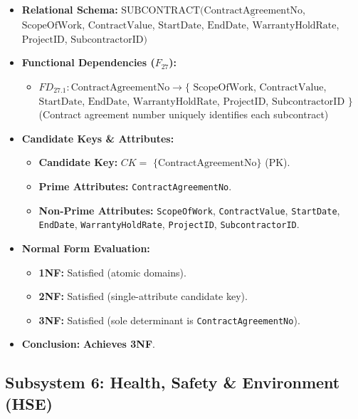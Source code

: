 \documentclass[a4paper,12pt]{report}
\providecommand{\tightlist}{%
  \setlength{\itemsep}{0pt}\setlength{\parskip}{0pt}}
\begin{document}
\begin{itemize}
\item
  \textbf{Relational Schema:} \(\text{SUBCONTRACT}(\underline{\text{ContractAgreementNo}}\), \(\text{ScopeOfWork}\), \(\text{ContractValue}\), \(\text{StartDate}\), \(\text{EndDate}\), \(\text{WarrantyHoldRate}\), \(\text{ProjectID}\), \(\text{SubcontractorID})\)
\item
  \textbf{Functional Dependencies (\(F_{27}\)):}

  \begin{itemize}
  \tightlist
  \item
    \(FD_{27.1}: \text{ContractAgreementNo} \rightarrow \{\) \(\text{ScopeOfWork}\), \(\text{ContractValue}\), \(\text{StartDate}\), \(\text{EndDate}\), \(\text{WarrantyHoldRate}\), \(\text{ProjectID}\), \(\text{SubcontractorID}\) \(\}\) (Contract agreement number uniquely identifies each subcontract)
  \end{itemize}
\item
  \textbf{Candidate Keys \& Attributes:}

  \begin{itemize}
  \item
    \textbf{Candidate Key:} \(CK =\) \(\{\text{ContractAgreementNo}\}\) (PK).
  \item
    \textbf{Prime Attributes:} \texttt{ContractAgreementNo}.
  \item
    \textbf{Non-Prime Attributes:} \texttt{ScopeOfWork}, \texttt{ContractValue}, \texttt{StartDate}, \texttt{EndDate}, \texttt{WarrantyHoldRate}, \texttt{ProjectID}, \texttt{SubcontractorID}.
  \end{itemize}
\item
  \textbf{Normal Form Evaluation:}

  \begin{itemize}
  \item
    \textbf{1NF:} Satisfied (atomic domains).
  \item
    \textbf{2NF:} Satisfied (single-attribute candidate key).
  \item
    \textbf{3NF:} Satisfied (sole determinant is \texttt{ContractAgreementNo}).
  \end{itemize}
\item
  \textbf{Conclusion:} \textbf{Achieves 3NF}.
\end{itemize}

\subsection{Subsystem 6: Health, Safety \& Environment (HSE)}\label{subsystem-6-health-safety-environment-hse}
\end{document}
